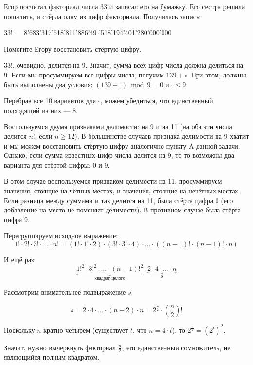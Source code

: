 \begin{itemize}
\itA Егор посчитал факториал числа 33 и записал его на бумажку. 
Его сестра решила пошалить, и стёрла одну из цифр факториала. Получилась запись: \smallskip \\
\centerline{$33!=$ 8'683'317'618'811'886'49$\square$'518'194'401'280'000'000} \smallskip
Помогите Егору восстановить стёртую цифру.

$33!$, очевидно, делится на 9. Значит, сумма всех цифр числа должна делиться на 9.
Если мы просуммируем все цифры числа, получим $139+\square$. При этом, должны быть выполнены
два условия: 
$(139+\square) \bmod 9 = 0$ и $\square \le 9$

Перебрав все 10 вариантов
для $\square$, можем убедиться, что единственный подходящий из них --- 8.

\itB Воспользуемся двумя признаками делимости: на 9 и на 11 (на оба эти числа делится $n!$, если $n \ge 12$).
В большинстве случаев признака делимости на 9 хватит и мы можем восстановить стёртую цифру аналогично
пункту A данной задачи. Однако, если сумма известных цифр числа делится на 9, то
то возможны два варианта для стёртой цифры: 0 и 9.

В этом случае воспользуемся признаком делимости на 11: просуммируем значения, стоящие на чётных местах,
и значения, стоящие на нечётных местах. Если разница между суммами и так делится на 11, была стёрта цифра 0
(его добавление на место не поменяет делимости). В противном случае была стёрта цифра 9.

\itC Перегруппируем исходное выражение:
$$1! \cdot 2! \cdot 3! \cdot \ldots \cdot n! = (1! \cdot 1! \cdot 2) \cdot (3! \cdot 3! \cdot 4) \cdot \ldots \cdot ((n-1)! \cdot (n-1)! \cdot n)$$

И ещё раз:
$$\underbrace{1!^2 \cdot 3!^2 \cdot \ldots \cdot (n-1)!^2}_\textrm{квадрат целого} \cdot \underbrace{2 \cdot 4 \cdot \ldots \cdot n}_\textrm{s}$$

Рассмотрим внимательнее подвыражение $s$:

$$s = 2 \cdot 4 \cdot \ldots \cdot (n-2) \cdot n = 2^{\frac{n}{2}} \cdot \left(\frac{n}{2}\right)!$$

Поскольку $n$ кратно четырём (существует $t$, что $n = 4\cdot t$), то 
$2^{\frac{n}{2}} = (2^t)^2$.

Значит, нужно вычеркнуть факториал $\frac{n}{2}$, это единственный сомножитель, не являющийся полным квадратом.

\end{itemize}
